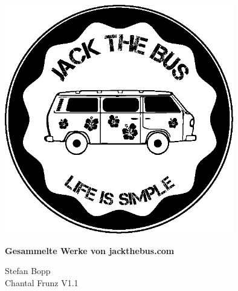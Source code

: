 \documentclass[11pt,nswissgerman]{article}
\begin{document}
\begin{titlepage}
\centering
\includegraphics[width=10cm]{../Bilder/Logo/Logo.png} \\
\vspace{2cm}
{\huge\bfseries Gesammelte Werke von jackthebus.com\par}
\vspace{2cm}
{\large Stefan Bopp} \\
{\large Chantal Frunz}
\vfill
{\Large V1.1}
\thispagestyle{empty}

\end{titlepage}
\newpage




\tableofcontents

\newpage



\cfoot{\thepage}

\end{document}
